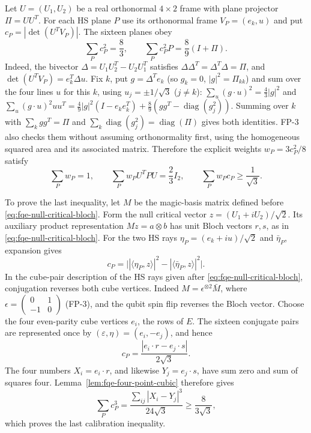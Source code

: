 Let $U=(U_1,U_2)$ be a real orthonormal $4\times2$ frame with plane projector
$\Pi=UU^T$. For each HS plane $P$ use its orthonormal frame
$V_P=(e_k,u)$ and put $c_P=|\det(U^TV_P)|$. The sixteen planes obey
\begin{equation}\label{eq:fqe-area-weighted-fusion}
 \sum_Pc_P^2=\frac83,\qquad
 \sum_Pc_P^2P=\frac89(I+\Pi).
\end{equation}
Indeed, the bivector $\Delta=U_1U_2^T-U_2U_1^T$ satisfies $\Delta\Delta^T=\Delta^T\Delta=\Pi$, and
$\det(U^TV_P)=e_k^T\Delta u$. Fix $k$, put $g=\Delta^Te_k$ (so $g_k=0$,
$|g|^2=\Pi_{kk}$) and sum over the four lines $u$ for this $k$, using $u_j=\pm1/\sqrt3$ ($j\ne k$):
$\sum_u(g\cdot u)^2=\frac43|g|^2$ and
$\sum_u(g\cdot u)^2uu^T=\frac49|g|^2(I-e_ke_k^T)+\frac89(gg^T-\operatorname{diag}(g_j^2))$.
Summing over $k$ with $\sum_kgg^T=\Pi$ and $\sum_k\operatorname{diag}(g_j^2)=\operatorname{diag}(\Pi)$ gives
both identities. FP-3 also checks them without
assuming orthonormality first, using the homogeneous squared area and
its associated matrix. Therefore the explicit weights
$w_P=3c_P^2/8$ satisfy
\begin{equation}\label{eq:fqe-plane-calibration}
 \sum_Pw_P=1,\qquad \sum_Pw_PU^TPU=\frac23I_2,\qquad
 \sum_Pw_Pc_P\ge\frac1{\sqrt3}.
\end{equation}

To prove the last inequality, let $M$ be the magic-basis matrix defined before
\eqref{eq:fqe-null-critical-bloch}. Form the null critical vector
$z=(U_1+iU_2)/\sqrt2$. Its auxiliary product representation
$Mz=a\otimes b$ has unit Bloch vectors $r,s$, as in
\eqref{eq:fqe-null-critical-bloch}.
For the two HS rays $\eta_P=(e_k+iu)/\sqrt2$ and $\bar\eta_P$,
expansion gives
\[
 c_P=\bigl||\langle\eta_P,z\rangle|^2
                 -|\langle\bar\eta_P,z\rangle|^2\bigr|.
\]
In the cube-pair description of the HS rays given after \eqref{eq:fqe-null-critical-bloch}, conjugation reverses both cube vertices.
Indeed $M=\epsilon^{\otimes2}\bar M$, where
$\epsilon=\left(\begin{smallmatrix}0&1\\-1&0\end{smallmatrix}\right)$
(FP-3), and the qubit spin flip reverses the Bloch vector.
Choose the four even-parity cube vertices $e_i$, the rows of $E$.
The sixteen conjugate pairs are represented once by
$(\varepsilon,\eta)=(e_i,-e_j)$, and hence
\[
 c_P=\frac{|e_i\cdot r-e_j\cdot s|}{2\sqrt3}.
\]
The four numbers $X_i=e_i\cdot r$, and likewise $Y_j=e_j\cdot s$,
have sum zero and sum of squares four. Lemma~\ref{lem:fqe-four-point-cubic}
therefore gives
\[
 \sum_Pc_P^3=\frac{\sum_{ij}|X_i-Y_j|^3}{24\sqrt3}
       \ge\frac8{3\sqrt3},
\]
which proves the last calibration inequality.

